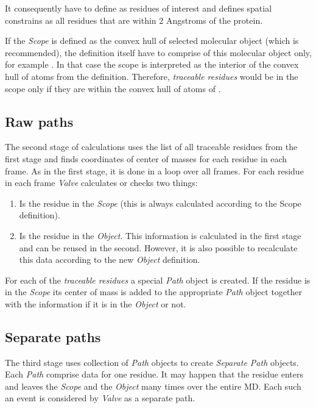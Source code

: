 \documentclass[a4paper,10pt,english]{sphinxmanual}
\begin{document}
It consequently have to define  as residues of interest and defines spatial constrains as all  residues that are within 2 Angstroms of the protein.

If the \emph{Scope} is defined as the convex hull of selected molecular object (which is recommended), the definition itself have to comprise of this molecular object only, for example . In that case the scope is interpreted as the interior of the convex hull of atoms from the definition. Therefore, \emph{traceable residues} would be in the scope only if they are within the convex hull of atoms of .


\subsection{Raw paths}
\label{valve/valve_manual:raw-paths}
The second stage of calculations uses the list of all traceable residues from the first stage and finds coordinates of center of masses for each residue in each frame. As in the first stage, it is done in a loop over all frames. For each residue in each frame \emph{Valve} calculates or checks two things:
\begin{enumerate}
\item {} 
Is the residue in the \emph{Scope} (this is always calculated according to the Scope definition).

\item {} 
Is the residue in the \emph{Object}. This information is calculated in the first stage and can be reused in the second. However, it is also possible to recalculate this data according to the new \emph{Object} definition.

\end{enumerate}

For each of the \emph{traceable residues} a special \emph{Path} object is created. If the residue is in the \emph{Scope} its center of mass is added to the appropriate \emph{Path} object together with the information if it is in the \emph{Object} or not.


\subsection{Separate paths}
\label{valve/valve_manual:separate-paths}
The third stage uses collection of \emph{Path} objects to create \emph{Separate Path} objects. Each \emph{Path} comprise data for one residue. It may happen that the residue enters and leaves the \emph{Scope} and the \emph{Object} many times over the entire MD. Each such an event is considered by \emph{Valve} as a separate path.
\end{document}
